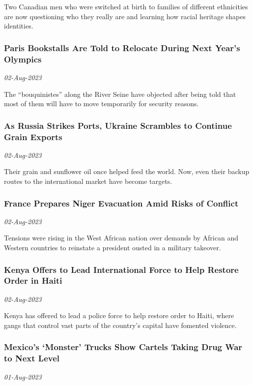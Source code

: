 Two Canadian men who were switched at birth to families of different ethnicities are now questioning who they really are and learning how racial heritage shapes identities.
\subsubsection{Paris Bookstalls Are Told to Relocate During Next Year’s Olympics \href{https://www.nytimes.com/2023/08/02/world/europe/paris-olympics-booksellers.html}{}}
\textit{02-Aug-2023}

The “bouquinistes” along the River Seine have objected after being told that most of them will have to move temporarily for security reasons.
\subsubsection{As Russia Strikes Ports, Ukraine Scrambles to Continue Grain Exports \href{https://www.nytimes.com/2023/08/02/world/europe/russia-ukraine-grain-exports.html}{}}
\textit{02-Aug-2023}

Their grain and sunflower oil once helped feed the world. Now, even their backup routes to the international market have become targets.
\subsubsection{France Prepares Niger Evacuation Amid Risks of Conflict \href{https://www.nytimes.com/2023/08/01/world/africa/niger-coup-mali-burkina-faso.html}{}}
\textit{02-Aug-2023}

Tensions were rising in the West African nation over demands by African and Western countries to reinstate a president ousted in a military takeover.
\subsubsection{Kenya Offers to Lead International Force to Help Restore Order in Haiti \href{https://www.nytimes.com/2023/08/01/world/americas/haiti-international-intervention.html}{}}
\textit{02-Aug-2023}

Kenya has offered to lead a police force to help restore order to Haiti, where gangs that control vast parts of the country’s capital have fomented violence.
\subsubsection{Mexico’s ‘Monster’ Trucks Show Cartels Taking Drug War to Next Level \href{https://www.nytimes.com/2023/08/01/world/americas/mexico-cartels-trucks.html}{}}
\textit{01-Aug-2023}

